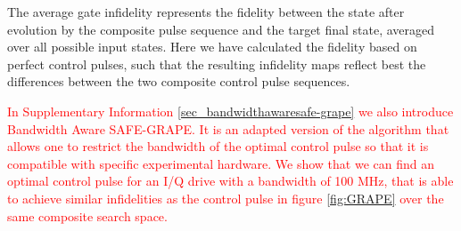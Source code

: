 \documentclass[%
 reprint,
 superscriptaddress,
 amsmath,amssymb,
 aps,
 prx,
]{revtex4-2}
\newcommand{\rev}[1]{\textcolor{red}{#1}}
\newcounter{algorithm} %
\begin{document}
The average gate infidelity represents the fidelity between the state after evolution by the composite pulse sequence and the target final state, averaged over all possible input states. Here we have calculated the fidelity based on perfect control pulses, such that the resulting infidelity maps reflect best the differences between the two composite control pulse sequences. 

\rev{In Supplementary Information \ref{sec_bandwidthawaresafe-grape} we also introduce Bandwidth Aware SAFE-GRAPE. It is an adapted version of the algorithm that allows one to restrict the bandwidth of the optimal control pulse so that it is compatible with specific experimental hardware. We show that we can find an optimal control pulse for an I/Q drive with a bandwidth of 100 MHz, that is able to achieve similar infidelities as the control pulse in figure \ref{fig:GRAPE} over the same composite search space.}
\end{document}
